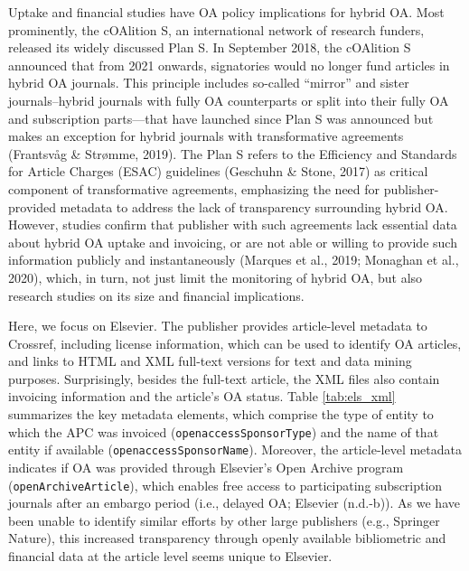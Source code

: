 \documentclass[a4paper,man,floatsintext,longtable,noextraspace,12pt]{apa6}
\begin{document}
Uptake and financial studies have OA policy implications for hybrid OA.
Most prominently, the cOAlition S, an international network of research
funders, released its widely discussed Plan S. In September 2018, the
cOAlition S announced that from 2021 onwards, signatories would no
longer fund articles in hybrid OA journals. This principle includes
so-called ``mirror'' and sister journals--hybrid journals with fully OA
counterparts or split into their fully OA and subscription parts---that
have launched since Plan S was announced but makes an exception for
hybrid journals with transformative agreements (Frantsvåg \& Strømme,
2019). The Plan S refers to the Efficiency and Standards for Article
Charges (ESAC) guidelines (Geschuhn \& Stone, 2017) as critical
component of transformative agreements, emphasizing the need for
publisher-provided metadata to address the lack of transparency
surrounding hybrid OA. However, studies confirm that publisher with such
agreements lack essential data about hybrid OA uptake and invoicing, or
are not able or willing to provide such information publicly and
instantaneously (Marques et al., 2019; Monaghan et al., 2020), which, in
turn, not just limit the monitoring of hybrid OA, but also research
studies on its size and financial implications.

Here, we focus on Elsevier. The publisher provides article-level
metadata to Crossref, including license information, which can be used
to identify OA articles, and links to HTML and XML full-text versions
for text and data mining purposes. Surprisingly, besides the full-text
article, the XML files also contain invoicing information and the
article's OA status. Table \ref{tab:els_xml} summarizes the key metadata
elements, which comprise the type of entity to which the APC was
invoiced (\texttt{openaccessSponsorType}) and the name of that entity if
available (\texttt{openaccessSponsorName}). Moreover, the article-level
metadata indicates if OA was provided through Elsevier's Open Archive
program (\texttt{openArchiveArticle}), which enables free access to
participating subscription journals after an embargo period (i.e.,
delayed OA; Elsevier (n.d.-b)). As we have been unable to identify
similar efforts by other large publishers (e.g., Springer Nature), this
increased transparency through openly available bibliometric and
financial data at the article level seems unique to Elsevier.
\end{document}
